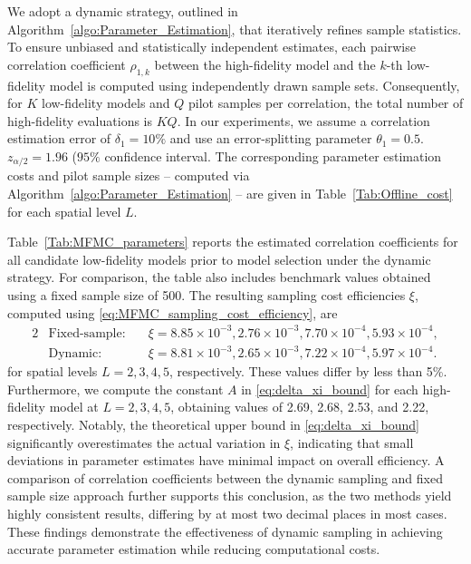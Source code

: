 

We adopt a dynamic strategy, outlined in Algorithm~\ref{algo:Parameter_Estimation}, that iteratively refines sample statistics. To ensure unbiased and statistically independent estimates, each pairwise correlation coefficient $\rho_{1,k}$ between the high-fidelity model and the $k$-th low-fidelity model is computed using independently drawn sample sets. Consequently, for $K$ low-fidelity models and $Q$ pilot samples per correlation, the total number of high-fidelity evaluations is $KQ$. In our experiments, we assume a correlation estimation error of $\delta_1 = 10\%$ and use an error-splitting parameter $\theta_1 = 0.5$. $z_{\alpha/2} = 1.96$ ($95\%$ confidence interval. The corresponding parameter estimation costs and pilot sample sizes -- computed via Algorithm~\ref{algo:Parameter_Estimation} -- are given in Table~\ref{Tab:Offline_cost} for each spatial level $L$.



Table~\ref{Tab:MFMC_parameters} reports the estimated correlation coefficients for all candidate low-fidelity models prior to model selection under the dynamic strategy. For comparison, the table also includes benchmark values obtained using a fixed sample size of 500. The resulting sampling cost efficiencies $\xi$, computed using \eqref{eq:MFMC_sampling_cost_efficiency}, are
%
\begin{alignat*}{2}
    &\text{Fixed-sample:}\quad &\xi = 8.85\times 10^{-3}, 2.76\times 10^{-3}, 7.70\times 10^{-4}, 5.93\times 10^{-4},\\
    &\text{Dynamic:}\quad &\xi =8.81\times 10^{-3}, 2.65\times 10^{-3}, 7.22\times 10^{-4},  5.97\times 10^{-4}.
\end{alignat*}
%
for spatial levels $L=2,3,4,5$, respectively. These values differ by less than 5\%.
Furthermore, we compute the constant $A$ in \eqref{eq:delta_xi_bound} for each high-fidelity model at $L=2,3,4,5$, obtaining values of 2.69, 2.68, 2.53, and 2.22, respectively. Notably, the theoretical upper bound in \eqref{eq:delta_xi_bound} significantly overestimates the actual variation in $\xi$, indicating that small deviations in parameter estimates have minimal impact on overall efficiency. A comparison of correlation coefficients between the dynamic sampling and fixed sample size approach further supports this conclusion, as the two methods yield highly consistent results, differing by at most two decimal places in most cases. These findings demonstrate the effectiveness of dynamic sampling in achieving accurate parameter estimation while reducing computational costs.







